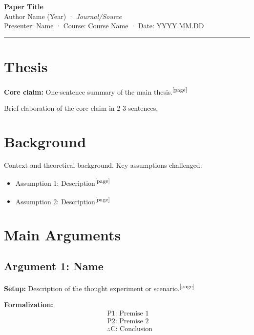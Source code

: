 \documentclass[10pt, a4paper]{article}
\title{}
\author{}
\date{}
\newcommand{\pagemark}[1]{\textsuperscript{\scriptsize[#1]}}
\begin{document}

\begin{center}
  {\Large\bfseries\sffamily Paper Title}\\[3pt]
  {\normalsize Author Name (Year) · \textit{Journal/Source}}\\[4pt]
  Presenter: Name · Course: Course Name · Date: YYYY.MM.DD
\end{center}

\vspace{0.3em}
\hrule
\vspace{0.5em}

\section*{Thesis}

\textbf{Core claim:} One-sentence summary of the main thesis.\pagemark{page}

Brief elaboration of the core claim in 2-3 sentences.

\section*{Background}

Context and theoretical background. Key assumptions challenged:
\begin{itemize}
  \item Assumption 1: Description\pagemark{page}
  \item Assumption 2: Description\pagemark{page}
\end{itemize}

\section*{Main Arguments}

\subsection*{Argument 1: Name}

\textbf{Setup:} Description of the thought experiment or scenario.\pagemark{page}

\textbf{Formalization:}
\begin{align*}
  &\text{P1: Premise 1} \\
  &\text{P2: Premise 2} \\
  &\therefore \text{C: Conclusion}
\end{align*}
\end{document}
